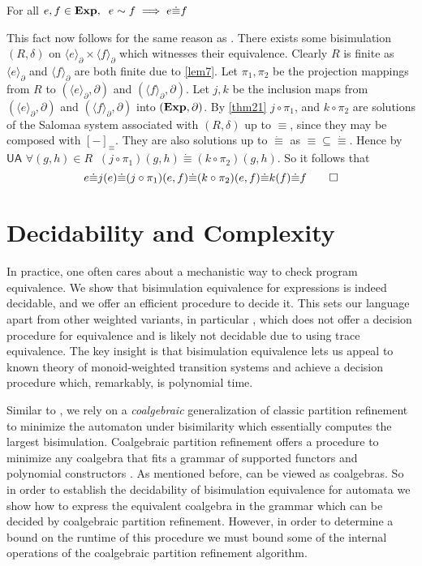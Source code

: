 \documentclass[a4paper,UKenglish,cleveref, autoref, thm-restate]{lipics-v2021}
\newcommand{\Exp}{\textbf{\upshape{Exp}}}
\newcommand{\Ax}[1]{\ensuremath{\mathsf{#1}}}
\newcommand{\wgkat}{\textsf{\upshape{wGKAT}}\xspace}
\newcommand{\probgkat}{\textsf{\upshape{ProbGKAT}}\xspace}
\newcommand{\kat}{\textsf{\upshape{KAT}}\xspace}
\newcommand{\kawt}{\textsf{\upshape{KAWT}}\xspace}
\theoremstyle{plain}\newtheoremrep{thm}{Theorem}[section]
\begin{document}
	\begin{thmrep}[Completeness]
		For all $e,f \in \Exp,\;\; e \sim f\implies e \dot\equiv f$
	\end{thmrep}
	\begin{appendixproof}
		This fact now follows for the same reason as \probgkat \cite{rozowski2023probabilistic}.
		There exists some bisimulation $(R, \delta)$ on $\langle e\rangle_\partial \times \langle f \rangle_\partial$ which witnesses their equivalence. Clearly $R$ is finite as $\langle e\rangle_\partial$ and $\langle f\rangle_\partial$ are both finite due to \ref{lem7}. Let $\pi_1, \pi_2$ be the projection mappings from $R$ to $(\langle e\rangle_\partial, \partial)$ and $(\langle f\rangle_\partial, \partial)$. Let $j, k$ be the inclusion maps from $(\langle e\rangle_\partial, \partial)$ and $(\langle f\rangle_\partial, \partial)$ into $(\Exp, \partial)$. By \cref{thm21} $j \circ \pi_1$, and $k \circ \pi_2$ are solutions of the Salomaa system associated with $(R, \delta)$ up to $\equiv$, since they may be composed with $[-]_\equiv$. They are also solutions up to $\dot\equiv$ as $\equiv \subseteq \dot\equiv$. Hence by \Ax{UA} $\forall (g,h) \in R \;\;(j\circ \pi_1)(g,h) \dot\equiv (k \circ \pi_2)(g,h)$. So it follows that
		$$e \dot\equiv j(e)\dot\equiv (j\circ \pi_1)(e,f) \dot\equiv (k\circ \pi_2)(e,f) \dot\equiv k(f) \dot\equiv f\qedhere$$
	\end{appendixproof}
	\section{Decidability and Complexity}\label{decisionS}
	In practice, one often cares about a mechanistic way to check program equivalence. We show that bisimulation equivalence for \wgkat expressions is indeed decidable, and we offer an efficient procedure to decide it. This sets our language apart from other weighted \kat variants, in particular \kawt, which does not offer a decision procedure for equivalence and is likely not decidable due to using trace equivalence. The key insight is that bisimulation equivalence lets us appeal to known theory of monoid-weighted transition systems and achieve a decision procedure which, remarkably, is polynomial time.
	
	Similar to \probgkat \cite{rozowski2023probabilistic}, we rely on a \emph{coalgebraic} generalization \cite{10.1007/978-3-030-30942-8_18} of classic partition refinement \cite{KanPartRefine, partrefine} to minimize the automaton under bisimilarity which essentially computes the largest bisimulation.  
	Coalgebraic partition refinement offers a procedure to minimize any coalgebra that fits a grammar of supported functors and polynomial constructors \cite{10.1007/978-3-030-30942-8_18}. As mentioned before, \wgkat can be viewed as coalgebras. So in order to establish the decidability of bisimulation equivalence for \wgkat automata we show how to express the equivalent coalgebra in the grammar which can be decided by coalgebraic partition refinement. However, in order to determine a bound on the runtime of this procedure we must bound some of the internal operations of the coalgebraic partition refinement algorithm. 
	
\end{document}
